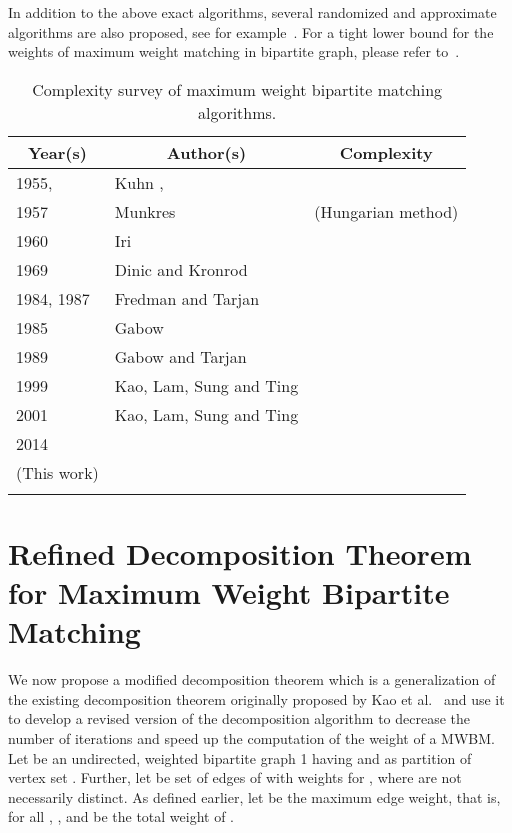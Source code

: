 \documentclass[runningheads,a4paper]{llncs}
\begin{document}
In addition to the above exact algorithms, several randomized and approximate algorithms
are also proposed, see for example~\cite{duan10,sankowski09}.
For a tight lower bound for the weights of maximum weight matching in bipartite graph, please refer to~\cite{das16_TLB_arXiv}.


\begin{table*}[htpb]
\centering
\caption{Complexity survey of maximum weight bipartite matching algorithms.}
\label{Table:MWBM}
\begin{tabular}{|l|l|l|} 	\hline
 \multicolumn{1}{|c|}{\bf Year(s)}		&  \multicolumn{1}{|c|}{\bf Author(s)}	& \multicolumn{1}{|c|}{\bf Complexity} \\
\hline
1955,				& Kuhn \cite{kuhn55},				&  		\\
1957				& Munkres \cite{munkres57} 				& (Hungarian method)	\\
\hline
1960				& Iri \cite{iri60,schrijver03} 			& 	\\
\hline
1969				& Dinic and Kronrod \cite{dinic69,schrijver03} 			& 	\\
\hline
1984, 1987 	&Fredman and Tarjan \cite{fredman87}  	& 	\\
\hline
1985  			&Gabow \cite{gabow85} 					& 	\\
\hline
1989 			& Gabow and Tarjan \cite{gabow89}	 	& 	\\
\hline
1999 			& Kao, Lam, Sung and Ting \cite{kao99}		 		&   \\
\hline
2001	 			& Kao, Lam, Sung and Ting \cite{kao02} 				&   \\
\hline
2014  & 		 & \\
\cline{3-3}
(This work)	& 	& 	\\
\cline{3-3}
			& 	& 	\\
\cline{3-3}
\hline
\end{tabular}
\end{table*}







\section[Refined Decomposition Theorem for MWBM]
{Refined Decomposition Theorem for Maximum Weight Bipartite Matching}
\label{Decomposition}
We now propose a modified decomposition theorem which is a generalization of the existing decomposition theorem originally proposed by Kao et al.~\cite{kao02,kao99}
and use it to develop a revised  version of the decomposition algorithm to decrease the
number of iterations and speed up the computation of the weight of a MWBM.
Let  be an undirected, weighted bipartite graph 1
having  and  as partition
of vertex set . Further, let  be set of
edges of  with weights  for , where   are
not necessarily distinct. As defined earlier, let  be the maximum edge
weight, that is, for all , , and
  be the total weight of  .
\end{document}
